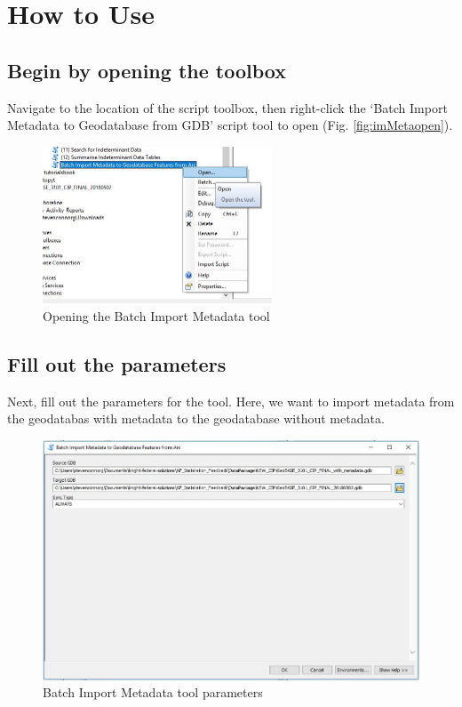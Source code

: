 \documentclass[openany]{book}
\theoremstyle{definition}
\theoremstyle{definition}
\theoremstyle{definition}
\theoremstyle{remark}
\begin{document}
\section{How to Use}\label{how-to-use-13}

\subsection{Begin by opening the
toolbox}\label{begin-by-opening-the-toolbox-13}

Navigate to the location of the script toolbox, then right-click the
`Batch Import Metadata to Geodatabase from GDB' script tool to open
(Fig. \ref{fig:imMetaopen}).

\begin{figure}[H]

{\centering \includegraphics[width=2.69in,]{figures/imMetaArc-open} 

}

\caption{Opening the Batch Import Metadata tool}\label{fig:imMetaArcopen}
\end{figure}

\subsection{Fill out the parameters}\label{fill-out-the-parameters-13}

Next, fill out the parameters for the tool. Here, we want to import
metadata from the geodatabas with metadata to the geodatabase without
metadata.

\begin{figure}[H]

{\centering \includegraphics[width=4.79in,]{figures/imMetaArc-params} 

}

\caption{Batch Import Metadata tool parameters}\label{fig:imMetaArcparams}
\end{figure}
\end{document}
